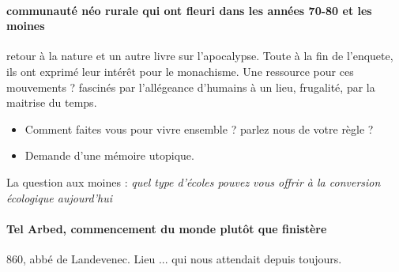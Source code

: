 \paragraph{communauté néo rurale qui ont fleuri dans les années 70-80 et les moines} retour à la nature et un autre livre sur l'apocalypse. Toute à la fin de l'enquete, ils ont exprimé leur intérêt pour le monachisme. Une ressource pour ces mouvements ? fascinés par l'allégeance d'humains à un lieu, frugalité, par la maitrise du temps.
\begin{itemize}
    \item Comment faites vous pour vivre ensemble ? parlez nous de votre règle ?
    \item Demande d'une mémoire utopique. 
\end{itemize}
La question aux moines : \textit{quel type d'écoles pouvez vous offrir à la conversion écologique aujourd'hui}


\paragraph{Tel Arbed, commencement du monde plutôt que finistère} 860, abbé de Landevenec. Lieu ... qui nous attendait depuis toujours. 
 
